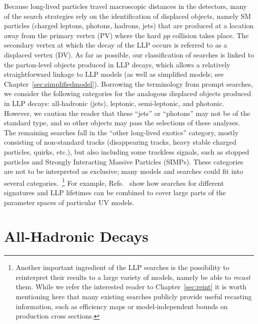 Because long-lived particles travel macroscopic distances in the detectors, many of the search strategies rely on the identification of displaced objects, namely SM particles (charged leptons, photons, hadrons, jets) that are produced at a location away from the primary vertex (PV) where the hard $pp$ collision takes place. The secondary vertex at which the decay of the LLP occurs is referred to as a displaced vertex (DV). As far as possible, our classification of searches is linked to the parton-level objects produced in LLP decays, which allows a relatively straightforward linkage to LLP models (as well as simplified models; see Chapter~\ref{sec:simplifiedmodel}). Borrowing the terminology from prompt searches, we  consider the following categories for the analogous displaced objects produced in LLP decays: all-hadronic (jets), leptonic, semi-leptonic, and photonic. However, we caution the reader that these ``jets'' or ``photons'' may not be of the standard type, and so other objects may pass the selections of these analyses. The remaining searches fall in the ``other long-lived exotics'' category, mostly consisting of non-standard tracks (disappearing tracks, heavy stable charged particles, quirks, etc.), but also including some trackless signals, such as stopped particles and Strongly Interacting Massive Particles (SIMPs). These categories are not to be interpreted as exclusive; many models and searches could fit into several categories.~\footnote{Another important ingredient of the LLP searches is the possibility to reinterpret their results to a large variety of models, namely be able to \emph{recast} them. While we refer the interested reader to Chapter~\ref{sec:reint} it is worth mentioning here that many existing searches publicly provide useful recasting information, such as efficiency maps or model-independent bounds on production cross sections.}  For example, Refs.~\cite{ATLAS-CONF-2018-003,Lee:2018pag,Fanti:2016MiniWorkshop} show how searches for different signatures and LLP lifetimes can be combined to cover large parts of the parameter spaces of particular UV models.

\section{All-Hadronic Decays}
\label{subsec:djets}

